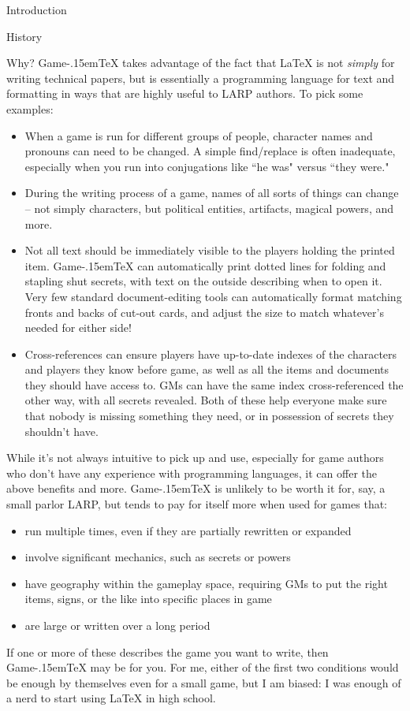 \documentclass[11pt,  total={6in, 8in}]{article}
\def\gametex{\mbox{Game\kern-.15em\TeX}}
\begin{document}
\begin{section}{Introduction}
\begin{subsection}{History}
\end{subsection}
\begin{subsection}{Why?}
\gametex{} takes advantage of the fact that LaTeX is not \textit{simply} for writing technical papers, but is essentially a programming language for text and formatting in ways that are highly useful to LARP authors.  To pick some examples:
\begin{itemize}
    \item When a game is run for different groups of people, character names and pronouns can need to be changed.  A simple find/replace is often inadequate, especially when you run into conjugations like ``he was" versus ``they were."
    \item During the writing process of a game, names of all sorts of things can change – not simply characters, but political entities, artifacts, magical powers, and more.
    \item Not all text should be immediately visible to the players holding the printed item.  \gametex{} can automatically print dotted lines for folding and stapling shut secrets, with text on the outside describing when to open it.  Very few standard document-editing tools can automatically format matching fronts and backs of cut-out cards, and adjust the size to match whatever's needed for either side!
    \item Cross-references can ensure players have up-to-date indexes of the characters and players they know before game, as well as all the items and documents they should have access to.  GMs can have the same index cross-referenced the other way, with all secrets revealed.  Both of these help everyone make sure that nobody is missing something they need, or in possession of secrets they shouldn't have.
\end{itemize}
While it's not always intuitive to pick up and use, especially for game authors who don't have any experience with programming languages, it can offer the above benefits and more.  \gametex{} is unlikely to be worth it for, say, a small parlor LARP, but tends to pay for itself more when used for games that:
\begin{itemize}
\item run multiple times, even if they are partially rewritten or expanded
\item involve significant mechanics, such as secrets or powers
\item have geography within the gameplay space, requiring GMs to put the right items, signs, or the like into specific places in game
\item are large or written over a long period
\end{itemize}

If one or more of these describes the game you want to write, then \gametex{} may be for you.  For me, either of the first two conditions would be enough by themselves even for a small game, but I am biased: I was enough of a nerd to start using \LaTeX{} in high school.
\end{subsection}
\end{section}
\end{document}
